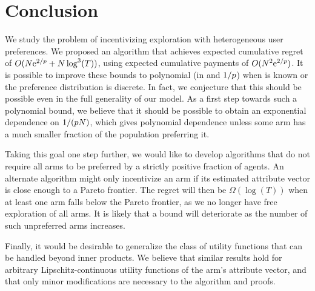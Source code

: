\section{Conclusion}
We study the problem of incentivizing exploration with heterogeneous
user preferences.
We proposed an algorithm that achieves expected cumulative regret of
$O(N \mathrm{e}^{2/p} + N \log^3(T))$,
using expected cumulative payments of $O(N^2 \mathrm{e}^{2/p})$.
It is possible to improve these bounds to polynomial (in \ARMNUM and
$1/p$) when \MinProb is known or the preference distribution is
discrete.
In fact, we conjecture that this should be possible even in the full
generality of our model.
As a first step towards such a polynomial bound, we believe that it
should be possible to obtain an exponential dependence on
$1/(p N)$, which gives polynomial dependence unless some
arm has a much smaller fraction of the population preferring it.

Taking this goal one step further, we would like to 
develop algorithms that do not require all arms to be preferred by a
strictly positive fraction of agents.
An alternate algorithm might only incentivize an arm if its estimated
attribute vector is close enough to a Pareto frontier.
The regret will then be $\Omega(\log(T))$ when at least one arm falls
below the Pareto frontier, as we no longer have free exploration of
all arms. 
It is likely that a bound will deteriorate as the number of such
unpreferred arms increases.

Finally, it would be desirable to generalize the class of utility
functions that can be handled beyond inner products.
We believe that similar results hold for arbitrary
Lipschitz-continuous utility functions of the arm's attribute vector,
and that only minor modifications are necessary to the algorithm and
proofs.
